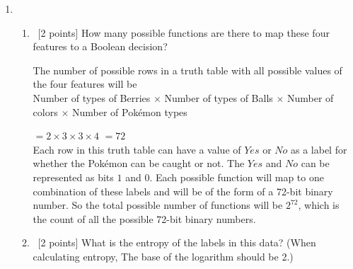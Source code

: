 \begin{enumerate}
\begin{enumerate}
  
  
\end{enumerate}

\item 

\begin{enumerate}
\item  ~[2 points] How many possible functions are there to map these four features to a Boolean decision? 

The number of possible rows in a truth table with all possible values of the four features will be\\

Number of types of Berries $\times$ Number of types of Balls $\times$ Number of colors $\times$ Number of Pok\'emon types

$= 2 \times 3 \times 3 \times 4$
$=72$\\

Each row in this truth table can have a value of $Yes$ or $No$ as a label for whether the Pok\'emon can be caught or not. The $Yes$ and $No$ can be represented as bits $1$ and $0$. Each possible function will map to one combination of these labels and will be of the form of a 72-bit binary number. So the total possible number of functions will be $2^{72}$, which is the count of all the possible 72-bit binary numbers.

\item  ~[2 points]  What is the entropy of the labels in this data? (When calculating entropy, The base of the logarithm should be 2.)


\end{enumerate}
\end{enumerate}

